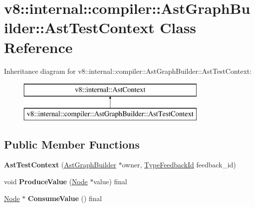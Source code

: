 \hypertarget{classv8_1_1internal_1_1compiler_1_1_ast_graph_builder_1_1_ast_test_context}{}\section{v8\+:\+:internal\+:\+:compiler\+:\+:Ast\+Graph\+Builder\+:\+:Ast\+Test\+Context Class Reference}
\label{classv8_1_1internal_1_1compiler_1_1_ast_graph_builder_1_1_ast_test_context}
Inheritance diagram for v8\+:\+:internal\+:\+:compiler\+:\+:Ast\+Graph\+Builder\+:\+:Ast\+Test\+Context\+:\begin{figure}[H]
\begin{center}
\leavevmode
\includegraphics[height=2.000000cm]{classv8_1_1internal_1_1compiler_1_1_ast_graph_builder_1_1_ast_test_context}
\end{center}
\end{figure}
\subsection*{Public Member Functions}
\begin{DoxyCompactItemize}
\item 
{\bfseries Ast\+Test\+Context} (\hyperlink{classv8_1_1internal_1_1compiler_1_1_ast_graph_builder}{Ast\+Graph\+Builder} $\ast$owner, \hyperlink{classv8_1_1internal_1_1_type_feedback_id}{Type\+Feedback\+Id} feedback\+\_\+id)\hypertarget{classv8_1_1internal_1_1compiler_1_1_ast_graph_builder_1_1_ast_test_context_ac46bce11e6643a4767d9838dbe644706}{}\label{classv8_1_1internal_1_1compiler_1_1_ast_graph_builder_1_1_ast_test_context_ac46bce11e6643a4767d9838dbe644706}

\item 
void {\bfseries Produce\+Value} (\hyperlink{classv8_1_1internal_1_1compiler_1_1_node}{Node} $\ast$value) final\hypertarget{classv8_1_1internal_1_1compiler_1_1_ast_graph_builder_1_1_ast_test_context_abd7306f5d4dbb72b20c65263b1568565}{}\label{classv8_1_1internal_1_1compiler_1_1_ast_graph_builder_1_1_ast_test_context_abd7306f5d4dbb72b20c65263b1568565}

\item 
\hyperlink{classv8_1_1internal_1_1compiler_1_1_node}{Node} $\ast$ {\bfseries Consume\+Value} () final\hypertarget{classv8_1_1internal_1_1compiler_1_1_ast_graph_builder_1_1_ast_test_context_a9cb5446e8bd9cdc765b601a9e6918792}{}\label{classv8_1_1internal_1_1compiler_1_1_ast_graph_builder_1_1_ast_test_context_a9cb5446e8bd9cdc765b601a9e6918792}

\end{DoxyCompactItemize}
